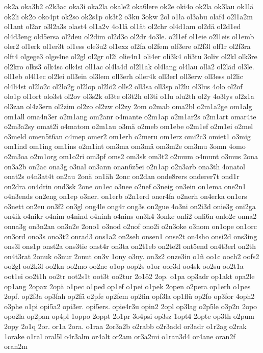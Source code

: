{ok2a
oka3b2
o2k3ac
oka3i
oka2la
okale2
oka6lere
ok2e
oki4o
ok2la
ok3lau
ok1lä
ok2li
ok2o
oko4pt
ok2so
ok2s1p
ok3t2
o3ku
3okw
2ol
o1la
ol3abu
olaf4
o2l1a2m
ol1ant
ol2ar
o3l2a3s
olast4
ol1a2v
4o1lä
ol1ät
ol2chr
ol4d1am
ol2dä
ol2d1ed
ol4d3eng
old5ersa
ol2deu
ol2dim
ol2d3o
ol2dr
4o3le.
o2l1ef
ol1eie
o2l1eis
ol1emb
oler2
ol1erk
ol1er3t
ol1ess
ole3u2
ol1exz
ol2fa
ol2fem
olf3ere
ol2f3l
olf1r
ol2f3ra
olft4
olgege3
olge4ne
ol2gl
ol2gr
ol2i
olie4n1
oli4er
oli3k4
oli3tu
3oliv
ol2kl
olk3re
ol2kro
olks3
olk4sc
olk4si
oll1ac
ol4la4d
ol2l1ak
ol4lang
ol4lau
ollä2
ol2läd
ol3le.
oll1eb
ol4l1ec
ol2lei
oll3ein
ol3lem
oll3erh
oller4k
oll3erl
oll3erw
oll3ess
ol2lic
ol4li4st
ol2lo2c
ol2lo2g
ol2lop
ol2lö2
olls2
oll3sa
oll3sp
ol2lu
ol3lus
4olo
ol2of
olo1p
ol1ort
olo3st
ol2ov
ol3s2k
ol3te
ol3t2h
ol3ti
o1lu
olu2th
ol2y
4o3lys
ol2z1a
ol3zan
ol4z3ern
ol2zim
ol2zo
ol2zw
ol2zy
2om
o2mab
oma2bl
o2m1a2ge
om1alg
om1all
oma4n3er
o2m1ang
om2anr
o4mante
o2m1ap
o2m1ar2s
o2m1art
omar4te
o2m3a2sy
omat2i
o4matom
o2m1au
o3mä
o2meb
om1ebe
o2m1ef
o2m1ei
o2mel
o3meld
omen5t6an
o4mep
omer2
om1erh
o2meru
om1erz
omi2c3
omiet1
o3mig
om1ind
om1ing
om1ins
o2m1int
om3ma
om3mä
om3m2e
om3mu
3omn
4omo
o2m3oa
o2m1org
om1o2ri
om3pf
oms2
om3sk
om3t2
o2mum
o4munt
o3mus
2ona
on3a2b
on2ac
ona3g
o3nal
on3ann
onan6z5ei
o2n1ap
o2n3arb
ona3th
4onatol
onat2s
o4n3at4t
on2au
2onä
on1äh
2onc
on2dan
onde8rers
onderer7t
ond1r
on2dra
on4drin
ond3sk
2one
on1ec
o3nee
o2nef
o3neig
on3ein
on1ema
one2n1
o4n3ends
on2eng
on1ep
o3ner.
on1erb
o2n1erd
oner4fa
o2nerh
on4erka
on1ers
o3nett
on2eu
on3f2
on3gl
ong4le
ong4r
ong3s
on2gue
4o3ni
on2i3d
onie3g
oni2ga
on4ik
o4nikr
o4nim
o4nind
o4ninh
o4nins
on3k4
3onke
onli2
onli6n
onlo2c
onna2
onna3g
on3n2an
on3n2e
2ono1
o3nod
o2nof
ono2i
o2n3oke
o3nom
on1ope
on1orc
on3ord
ono3s
ono3t2
onrad3
ons1a2
on2seb
onsen1
onse2t
on4sho
onsi2d
ons3ing
ons3l
ons1p
onst2a
ons3tie
onst4r
on3ta
on2t1eb
on2te2l
ont5end
on4t3erl
on2th
on4t3rat
2onuk
o3nur
2onut
on3v
1ony
o3ny.
on3z2
onze3in
o1ñ
oo1c
ooch2
oofs2
oo2gl
oo2k3l
oo2kn
oo2mo
oo2ne
o1op
oop2s
o1or
oor3d
oo4sk
oo2su
oo2t1a
oot1ei
oo2t1h
oo2tr
oot2s1t
oot3t
oo2tur
2o1ö2
2op.
o1pa
op3adr
op1akt
opa2le
op1ang
2opax
2opä
o1pec
o1ped
op1ef
o1pei
o1pek
2open
o2pera
op1erh
o1pes
2opf.
op2f3a
op3fah
op2fä
o2pfe
op2fem
op2fin
opf3la
op1flü
op2fo
op3for
4oph2
o3phe
o1pi
opi5a2
opi3er.
opi5ers.
opie4r3u
opin2
2opl
op3lag
o2p5le
o3p2n
2opo
opo2la
op2pan
op4pl
1oppo
2oppt
2o1pr
3o4psi
op3sz
1opt4
2opte
op3th
o2pum
2opy
2o1q
2or.
or1a
2ora.
o1raa
2or3a2b
o2rabb
o2r3add
or3adr
o1r2ag
o2rak
1orake
o1ral
oral5l
o4r3alm
or4alt
or2am
or3a2mi
o1ran3d4
or4ane
oran2f
oran2m
}
